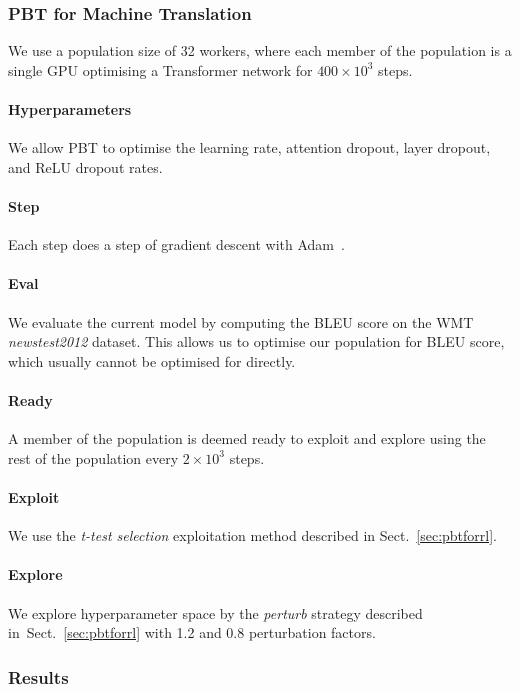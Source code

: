 \documentclass{article} %
\newcommand{\sref}[1]{Sect.~\ref{#1}}
\begin{document}
\subsubsection{PBT for Machine Translation}
We use a population size of 32 workers, where each member of the population is a single GPU optimising a Transformer network for $400\times10^3$ steps. 
\vspace{-0.5em}\paragraph{Hyperparameters}We allow PBT to optimise the learning rate, attention dropout, layer dropout, and ReLU dropout rates. 
\vspace{-0.5em}\paragraph{Step}Each step does a step of gradient descent with Adam~\citep{adam}. 
\vspace{-0.5em}\paragraph{Eval}We evaluate the current model by computing the BLEU score on the WMT \textit{newstest2012} dataset. This allows us to optimise our population for BLEU score, which usually cannot be optimised for directly. 
\vspace{-0.5em}\paragraph{Ready}A member of the population is deemed ready to exploit and explore using the rest of the population every $2\times10^3$ steps. 
\vspace{-0.5em}\paragraph{Exploit}We use the \emph{t-test selection} exploitation method described in \sref{sec:pbtforrl}. \vspace{-0.5em}\paragraph{Explore}We explore hyperparameter space by the \emph{perturb} strategy described in~\sref{sec:pbtforrl} with 1.2 and 0.8 perturbation factors.

\subsubsection{Results}
\end{document}
